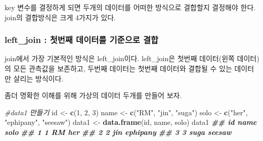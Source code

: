 \documentclass[
]{book}
\newenvironment{Shaded}{\begin{snugshade}}{\end{snugshade}}
\newcommand{\CommentTok}[1]{\textcolor[rgb]{0.56,0.35,0.01}{\textit{#1}}}
\newcommand{\DecValTok}[1]{\textcolor[rgb]{0.00,0.00,0.81}{#1}}
\newcommand{\DocumentationTok}[1]{\textcolor[rgb]{0.56,0.35,0.01}{\textbf{\textit{#1}}}}
\newcommand{\FunctionTok}[1]{\textcolor[rgb]{0.13,0.29,0.53}{\textbf{#1}}}
\newcommand{\NormalTok}[1]{#1}
\newcommand{\OtherTok}[1]{\textcolor[rgb]{0.56,0.35,0.01}{#1}}
\newcommand{\StringTok}[1]{\textcolor[rgb]{0.31,0.60,0.02}{#1}}
\begin{document}
key 변수를 결정하게 되면 두개의 데이터를 어떠한 방식으로 결합할지 결정해야 한다. join의 결합방식은 크게 4가지가 있다.

\subsubsection{left\_join : 첫번째 데이터를 기준으로 결합}\label{left_join-uxccabuxbc88uxc9f8-uxb370uxc774uxd130uxb97c-uxae30uxc900uxc73cuxb85c-uxacb0uxd569}

join에서 가장 기본적인 방식은 left\_join이다. left\_join은 첫번째 데이터(왼쪽 데이터)의 모든 관측값을 보존하고, 두번째 데이터는 첫번째 데이터와 결합될 수 있는 데이터만 살리는 방식이다.

좀더 명확한 이해를 위해 가상의 데이터 두개를 만들어 보자.

\begin{Shaded}
\begin{Highlighting}[]
\CommentTok{\#data1 만들기 }
\NormalTok{id }\OtherTok{\textless{}{-}} \FunctionTok{c}\NormalTok{(}\DecValTok{1}\NormalTok{, }\DecValTok{2}\NormalTok{, }\DecValTok{3}\NormalTok{)}
\NormalTok{name }\OtherTok{\textless{}{-}} \FunctionTok{c}\NormalTok{(}\StringTok{"RM"}\NormalTok{, }\StringTok{"jin"}\NormalTok{, }\StringTok{"suga"}\NormalTok{)}
\NormalTok{solo }\OtherTok{\textless{}{-}} \FunctionTok{c}\NormalTok{(}\StringTok{"her"}\NormalTok{, }\StringTok{"ephipany"}\NormalTok{, }\StringTok{"seesaw"}\NormalTok{)}
\NormalTok{data1 }\OtherTok{\textless{}{-}} \FunctionTok{data.frame}\NormalTok{(id, name, solo)}
\NormalTok{data1}
\DocumentationTok{\#\#   id name     solo}
\DocumentationTok{\#\# 1  1   RM      her}
\DocumentationTok{\#\# 2  2  jin ephipany}
\DocumentationTok{\#\# 3  3 suga   seesaw}


\end{Highlighting}
\end{Shaded}
\end{document}
